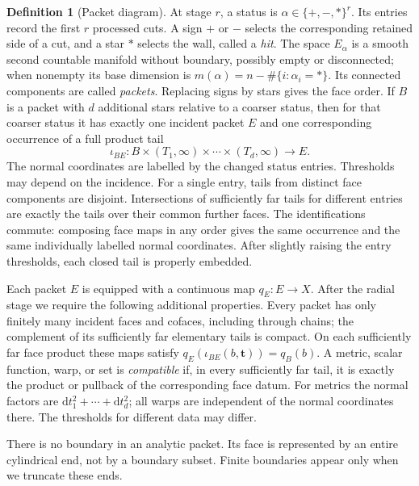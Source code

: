\documentclass[11pt]{article}
\numberwithin{equation}{section}
\theoremstyle{definition}
\newtheorem{definition}[theorem]{Definition}
\theoremstyle{remark}
\begin{document}
\begin{definition}[Packet diagram]\label{packet:category}
At stage $r$, a status is $\alpha\in\{+,-,*\}^{r}$.
Its entries record the first $r$ processed cuts.
A sign $+$ or $-$ selects the corresponding retained side of a cut,
and a star $*$ selects the wall, called a \emph{hit}.
The space $E_\alpha$ is a smooth second countable manifold without boundary,
possibly empty or disconnected; when nonempty its base dimension is
$m(\alpha)=n-\#\{i:\alpha_i=*\}$.  Its connected components are called
\emph{packets}.  Replacing signs by stars gives the face order.
If $B$ is a packet with $d$ additional stars relative to a coarser status,
then for that coarser status it has exactly one incident packet $E$ and
one corresponding occurrence of a full product tail
\begin{equation}\label{packet:tail}
 \iota_{BE}:B\times(T_1,\infty)\times\cdots\times(T_d,\infty)
       \longrightarrow E.
\end{equation}
The normal coordinates are labelled by the changed status entries.
Thresholds may depend on the incidence.  For a single entry, tails
from distinct face components are disjoint.  Intersections of sufficiently
far tails for different entries are exactly the tails over their common
further faces.  The identifications commute: composing face maps in
any order gives the same occurrence and the same individually labelled
normal coordinates.  After slightly raising the entry thresholds,
each closed tail is properly embedded.

Each packet $E$ is equipped with a continuous map $q_E:E\to X$.
After the radial stage we require the following additional properties.
Every packet has only finitely many incident faces and cofaces, including
through chains; the complement of its sufficiently far elementary tails
is compact.  On each sufficiently far face product these maps satisfy
$q_E(\iota_{BE}(b,\mathbf t))=q_B(b)$.
A metric, scalar function, warp, or set is \emph{compatible} if, in every
sufficiently far tail, it is exactly the product or pullback of the
corresponding face datum.  For metrics the normal factors are
$\mathrm d t_1^2+\cdots+\mathrm d t_d^2$; all warps are independent of the normal
coordinates there.  The thresholds for different data may differ.
\end{definition}

There is no boundary in an analytic packet.  Its face is represented by
an entire cylindrical end, not by a boundary subset.  Finite boundaries
appear only when we truncate these ends.
\end{document}
